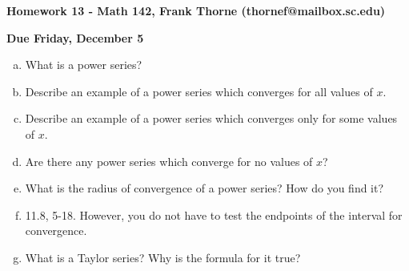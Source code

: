 \documentclass[12pt]{article}
\begin{document}
\setlength{\topmargin}{-2mm}





\begin{center}{\bf Homework 13 - Math 142, Frank Thorne (thornef@mailbox.sc.edu)}
\end{center}
\begin{center}
{\bf Due Friday, December 5}
\end{center}

\begin{enumerate}[(a)]
\item
What is a power series?

\item
Describe an example of a power series which converges for all values of $x$.

\item
Describe an example of a power series which converges only for some values of $x$.

\item
Are there any power series which converge for no values of $x$?

\item
What is the radius of convergence of a power series? How do you find it?

\item
11.8, 5-18. However, you do not have to test the endpoints of the interval for convergence.

\item
What is a Taylor series? Why is the formula for it true?


\end{enumerate}
\end{document}
